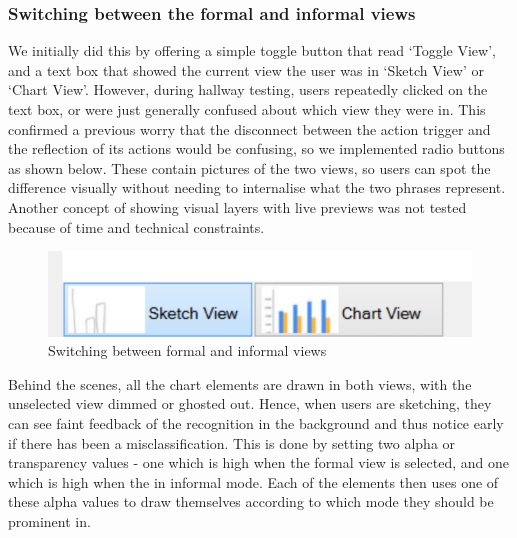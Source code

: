 	\subsubsection{Switching between the formal and informal views}
	We initially did this by offering a simple toggle button that read `Toggle View', and a text box that showed the current view the user was in `Sketch View' or `Chart View'. However, during hallway testing, users repeatedly clicked on the text box, or were just generally confused about which view they were in. This confirmed a previous worry that the disconnect between the action trigger and the reflection of its actions would be confusing, so we implemented radio buttons as shown below. These contain pictures of the two views, so users can spot the difference visually without needing to internalise what the two phrases represent. Another concept of showing visual layers with live previews was not tested because of time and technical constraints.
	
	
	\begin{figure}[h]
	\includegraphics[scale=1]{toggle}
	\caption{Switching between formal and informal views}
	\end{figure}
	
	Behind the scenes, all the chart elements are drawn in both views, with the unselected view dimmed or ghosted out. Hence, when users are sketching, they can see faint feedback of the recognition in the background and thus notice early if there has been a misclassification. This is done by setting two alpha or transparency values - one which is high when the formal view is selected, and one which is high when the in informal mode. Each of the elements then uses one of these alpha values to draw themselves according to which mode they should be prominent in.